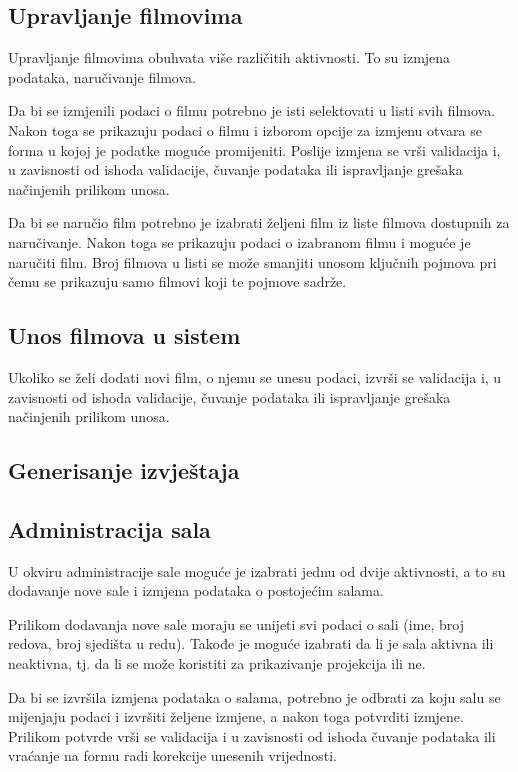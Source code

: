 \subsection{Upravljanje filmovima}
Upravljanje filmovima obuhvata više različitih aktivnosti. To su izmjena podataka, naručivanje filmova.

Da bi se izmjenili podaci o filmu potrebno je isti selektovati u listi svih filmova. Nakon toga se prikazuju podaci o filmu i 
izborom opcije za izmjenu otvara se forma u kojoj je podatke moguće promijeniti. Poslije izmjena se vrši validacija i, u zavisnosti
 od ishoda validacije, čuvanje podataka ili ispravljanje grešaka načinjenih prilikom unosa. 
 
Da bi se naručio film potrebno je izabrati željeni film iz liste filmova dostupnih za naručivanje. Nakon toga se prikazuju podaci o 
izabranom filmu i moguće je naručiti film. Broj filmova u listi se može smanjiti unosom ključnih pojmova pri čemu se prikazuju samo 
filmovi koji te pojmove sadrže.

\subsection{Unos filmova u sistem}
Ukoliko se želi dodati novi film, o njemu se unesu podaci, izvrši se validacija i, u zavisnosti od ishoda validacije, čuvanje podataka
 ili ispravljanje grešaka načinjenih prilikom unosa.

\subsection{Generisanje izvještaja}

\subsection{Administracija sala}
U okviru administracije sale moguće je izabrati jednu od dvije aktivnosti, a to su dodavanje nove sale i izmjena podataka o postojećim salama.

Prilikom dodavanja nove sale moraju se unijeti svi podaci o sali (ime, broj redova, broj sjedišta u redu). Takođe je moguće izabrati da li je sala aktivna ili neaktivna, tj. da li se može koristiti za prikazivanje projekcija ili ne.

Da bi se izvršila izmjena podataka o salama, potrebno je odbrati za koju salu se mijenjaju podaci i izvršiti željene izmjene, a nakon toga potvrditi izmjene. Prilikom potvrde  vrši se validacija i u zavisnosti od ishoda čuvanje podataka ili vraćanje na formu radi korekcije unesenih vrijednosti.

